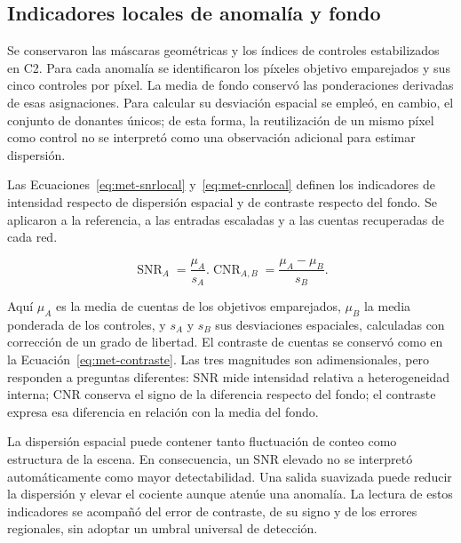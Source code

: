 \subsection{Indicadores locales de anomalía y fondo}\label{subsec:met-locales}
Se conservaron las máscaras geométricas y los índices de controles estabilizados en C2. Para cada anomalía se identificaron los píxeles objetivo emparejados y sus cinco controles por píxel. La media de fondo conservó las ponderaciones derivadas de esas asignaciones. Para calcular su desviación espacial se empleó, en cambio, el conjunto de donantes únicos; de esta forma, la reutilización de un mismo píxel como control no se interpretó como una observación adicional para estimar dispersión.

Las Ecuaciones~\eqref{eq:met-snrlocal} y~\eqref{eq:met-cnrlocal} definen los indicadores de intensidad respecto de dispersión espacial y de contraste respecto del fondo. Se aplicaron a la referencia, a las entradas escaladas y a las cuentas recuperadas de cada red.
\begin{samepage}\begin{subequations}
\begin{equation}\operatorname{SNR}_{A}=\frac{\mu_A}{s_A}.\label{eq:met-snrlocal}\end{equation}
\begin{equation}\operatorname{CNR}_{A,B}=\frac{\mu_A-\mu_B}{s_B}.\label{eq:met-cnrlocal}\end{equation}
\end{subequations}\end{samepage}
Aquí $\mu_A$ es la media de cuentas de los objetivos emparejados, $\mu_B$ la media ponderada de los controles, y $s_A$ y $s_B$ sus desviaciones espaciales, calculadas con corrección de un grado de libertad. El contraste de cuentas se conservó como en la Ecuación~\eqref{eq:met-contraste}. Las tres magnitudes son adimensionales, pero responden a preguntas diferentes: SNR mide intensidad relativa a heterogeneidad interna; CNR conserva el signo de la diferencia respecto del fondo; el contraste expresa esa diferencia en relación con la media del fondo.

La dispersión espacial puede contener tanto fluctuación de conteo como estructura de la escena. En consecuencia, un SNR elevado no se interpretó automáticamente como mayor detectabilidad. Una salida suavizada puede reducir la dispersión y elevar el cociente aunque atenúe una anomalía. La lectura de estos indicadores se acompañó del error de contraste, de su signo y de los errores regionales, sin adoptar un umbral universal de detección.

